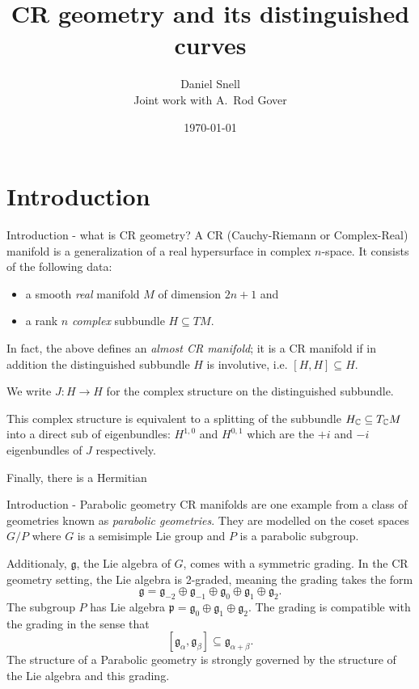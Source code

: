 \documentclass[handout]{beamer}
\title{CR geometry and its distinguished curves}
\author[Daniel Snell]{Daniel Snell\\{ \bigskip\bigskip \small Joint work with
A.\ Rod Gover}}
\date{\today}
\begin{document}
\begin{frame}
  \titlepage
\end{frame}

\section{Introduction}
\begin{frame}{Introduction - what is CR geometry?}
  A CR (Cauchy-Riemann or Complex-Real) manifold is a generalization of a real
  hypersurface in complex $n$-space.
  \pause
  It consists of the following data:
  \begin{itemize}
    \item a smooth \emph{real} manifold $M$ of dimension $2n+1$ and
    \item a rank $n$ \emph{complex} subbundle $H \subseteq TM$.
  \end{itemize}
  In fact, the above defines an \emph{almost CR manifold}; it is a CR manifold
  if in addition the distinguished subbundle $H$ is involutive, i.e. $[H,H]
  \subseteq H$.
  \pause

  We write $J : H \to H$ for the complex structure on the distinguished subbundle. 

  This complex structure is equivalent to a splitting of the subbundle $H_{\mathbb{C}}
  \subseteq T_{\mathbb{C}}M$ into a direct sub of eigenbundles: $H^{1,0}$ and
  $H^{0,1}$ which are the $+i$ and $-i$ eigenbundles of $J$ respectively.

  \pause 
  Finally, there is a Hermitian 

\end{frame}

\begin{frame}{Introduction - Parabolic geometry}
  CR manifolds are one example from a class of geometries known as
  \emph{parabolic geometries}.
  They are modelled on the coset spaces $G/P$ where $G$ is a semisimple Lie
  group and $P$ is a parabolic subgroup.

  Additionaly, $\mathfrak{g}$, the Lie algebra of $G$, comes with a symmetric
  grading.
  In the CR geometry setting, the Lie algebra is 2-graded, meaning the grading
  takes the form
  \[
    \mathfrak{g} = \mathfrak{g}_{-2} \oplus \mathfrak{g}_{-1}\oplus
    \mathfrak{g}_{0}\oplus\mathfrak{g}_{1}\oplus \mathfrak{g}_{2}.
  \]
  The subgroup $P$ has Lie algebra $\mathfrak{p} =
  \mathfrak{g}_{0}\oplus\mathfrak{g}_{1}\oplus \mathfrak{g}_{2}$.
  The grading is compatible with the grading in the sense that
  \[
    [\mathfrak{g}_\alpha, \mathfrak{g}_\beta] \subseteq \mathfrak{g}_{\alpha +
    \beta}.
  \]
  The structure of a Parabolic geometry is strongly governed by the structure
  of the Lie algebra and this grading.
\end{frame}
\end{document}
